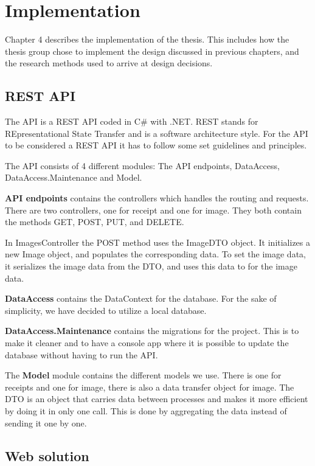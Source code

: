 \cleardoublepage
\chapter{Implementation}
\label{ch:implementation}
Chapter 4 describes the implementation of the thesis.
This includes how the thesis group chose to implement the design discussed in previous chapters, and the research methods used to arrive at design decisions.

\section{REST API}\label{sec:REST API}

The API is a REST API coded in C\# with .NET.
REST stands for REpresentational State Transfer and is a software architecture style.
For the API to be considered a REST API it has to follow some set guidelines and principles.

The API consists of 4 different modules: The API endpoints, DataAccess,\\
DataAccess.Maintenance and Model.

\textbf{API endpoints} contains the controllers which handles the routing and requests.
There are two controllers, one for receipt and one for image.
They both contain the methods GET, POST, PUT, and DELETE\@.

In ImagesController the POST method uses the ImageDTO object.
It initializes a new Image object, and populates the corresponding data.
To set the image data, it serializes the image data from the DTO, and uses this data to for the image data.

\textbf{DataAccess} contains the DataContext for the database.
For the sake of simplicity, we have decided to utilize a local database.

\textbf{DataAccess.Maintenance} contains the migrations for the project.
This is to make it cleaner and to have a console app where it is possible to update the database without having to run the API\@.

The \textbf{Model} module contains the different models we use.
There is one for receipts and one for image, there is also a data transfer object for image.
The DTO is an object that carries data between processes and makes it more efficient by doing it in only one call.
This is done by aggregating the data instead of sending it one by one.

\section{Web solution}\label{sec:Web solution}

